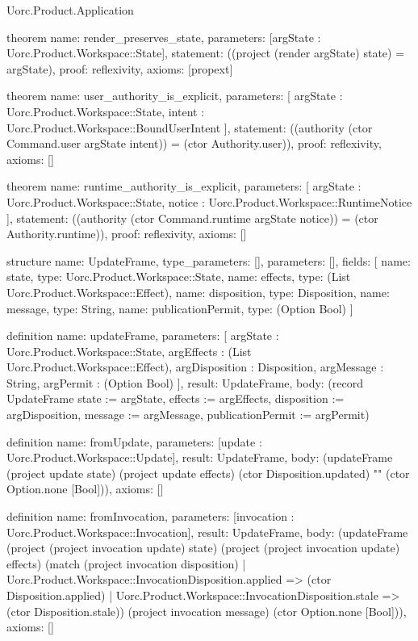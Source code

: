 \begin{lexlean}{Uorc.Product.Application}
\begin{semanticmodule}
theorem{
  name: render_preserves_state,
  parameters: [argState : Uorc.Product.Workspace::State],
  statement: ((project (render argState) state) = argState),
  proof: reflexivity{},
  axioms: [propext]
}

theorem{
  name: user_authority_is_explicit,
  parameters: [
    argState : Uorc.Product.Workspace::State,
    intent : Uorc.Product.Workspace::BoundUserIntent
  ],
  statement: ((authority (ctor Command.user argState intent)) = (ctor Authority.user)),
  proof: reflexivity{},
  axioms: []
}

theorem{
  name: runtime_authority_is_explicit,
  parameters: [
    argState : Uorc.Product.Workspace::State,
    notice : Uorc.Product.Workspace::RuntimeNotice
  ],
  statement: ((authority (ctor Command.runtime argState notice)) = (ctor Authority.runtime)),
  proof: reflexivity{},
  axioms: []
}

structure{
  name: UpdateFrame,
  type_parameters: [],
  parameters: [],
  fields: [
    {name: state, type: Uorc.Product.Workspace::State},
    {name: effects, type: (List Uorc.Product.Workspace::Effect)},
    {name: disposition, type: Disposition},
    {name: message, type: String},
    {name: publicationPermit, type: (Option Bool)}
  ]
}

definition{
  name: updateFrame,
  parameters: [
    argState : Uorc.Product.Workspace::State,
    argEffects : (List Uorc.Product.Workspace::Effect),
    argDisposition : Disposition,
    argMessage : String,
    argPermit : (Option Bool)
  ],
  result: UpdateFrame,
  body: (record UpdateFrame {state := argState, effects := argEffects, disposition := argDisposition, message := argMessage, publicationPermit := argPermit})
}

definition{
  name: fromUpdate,
  parameters: [update : Uorc.Product.Workspace::Update],
  result: UpdateFrame,
  body: (updateFrame (project update state) (project update effects) (ctor Disposition.updated) "" (ctor Option.none [Bool])),
  axioms: []
}

definition{
  name: fromInvocation,
  parameters: [invocation : Uorc.Product.Workspace::Invocation],
  result: UpdateFrame,
  body: (updateFrame (project (project invocation update) state) (project (project invocation update) effects) (match (project invocation disposition)
    | Uorc.Product.Workspace::InvocationDisposition.applied => (ctor Disposition.applied)
    | Uorc.Product.Workspace::InvocationDisposition.stale => (ctor Disposition.stale)) (project invocation message) (ctor Option.none [Bool])),
  axioms: []
}


\end{semanticmodule}
\end{lexlean}

